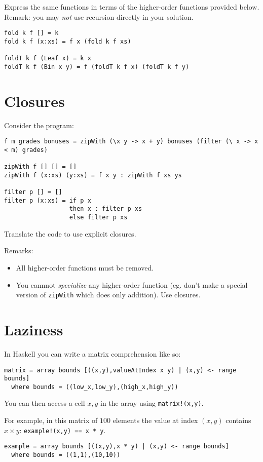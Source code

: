 \documentclass{article}
\begin{document}
Express the same functions in terms of the higher-order functions
provided below.  Remark: you may \emph{not} use recursion directly in
your solution.

\begin{verbatim}
fold k f [] = k
fold k f (x:xs) = f x (fold k f xs)

foldT k f (Leaf x) = k x
foldT k f (Bin x y) = f (foldT k f x) (foldT k f y)
\end{verbatim}

\section{Closures}

Consider the program:
\begin{verbatim}
f m grades bonuses = zipWith (\x y -> x + y) bonuses (filter (\ x -> x < m) grades)

zipWith f [] [] = []
zipWith f (x:xs) (y:xs) = f x y : zipWith f xs ys

filter p [] = []
filter p (x:xs) = if p x
                  then x : filter p xs
                  else filter p xs
\end{verbatim}

Translate the code to use explicit closures. 

Remarks:
\begin{itemize}
\item All higher-order functions must be removed.
\item You cannnot \emph{specialize} any higher-order function
  (eg. don't make a special version of \texttt{zipWith} which does
  only addition).  Use closures.
\end{itemize}

\newpage
\section{Laziness}

In Haskell you can write a matrix comprehension like so:
\begin{verbatim}
matrix = array bounds [((x,y),valueAtIndex x y) | (x,y) <- range bounds]
  where bounds = ((low_x,low_y),(high_x,high_y))
\end{verbatim}

You can then access a cell $x,y$ in the array using \texttt{matrix!(x,y)}.

For example, in this matrix of $100$ elements the value at index $(x,y)$ contains $x ×
y$: \texttt{example!(x,y) == x * y}.
\begin{verbatim}
example = array bounds [((x,y),x * y) | (x,y) <- range bounds]
  where bounds = ((1,1),(10,10))
\end{verbatim}
\end{document}
